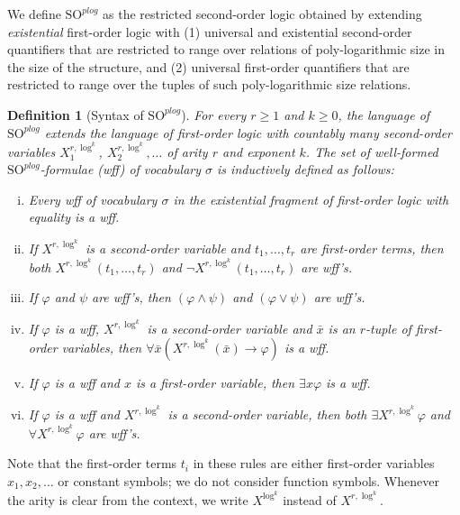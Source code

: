 \documentclass{article}
\newtheorem{definition}{Definition}
\begin{document}
We define $\mathrm{SO}^{\mathit{plog}}$ as the restricted second-order logic obtained by extending \emph{existential} first-order logic with (1) universal and existential second-order quantifiers that are restricted to range over relations of poly-logarithmic size in the size of the structure, and (2) universal first-order quantifiers that are restricted to range over the tuples of such poly-logarithmic size relations. 

\begin{definition}[Syntax of $\mathrm{SO}^{\mathit{plog}}$]
For every $r{\geq}1$ and $k{\geq}0$, the language of $\mathrm{SO}^{\mathit{plog}}$ extends the language of first-order logic with countably many second-order variables $X_1^{r,\log^k}$, $X_2^{r,\log^k}, \dots$ of {\em arity $r$} and {\em exponent $k$}. The set of well-formed $\mathrm{SO}^{\mathit{plog}}$-formulae (wff) of vocabulary $\sigma$ is inductively defined as follows:
\begin{enumerate}[i.]

\item Every wff of vocabulary $\sigma$ in the existential fragment of first-order logic with equality is a wff.

\item If $X^{r,\log^k}$ is a second-order variable and $t_1, \ldots, t_r$ are first-order terms, then both $X^{r,\log^k}(t_1, \ldots, t_r)$ and $\neg X^{r,\log^k}(t_1, \ldots, t_r)$ are wff's.

\item If $\varphi$ and $\psi$ are wff's, then $(\varphi \wedge \psi)$ and $(\varphi \vee \psi)$ are wff's.
    
\item If $\varphi$ is a wff, $X^{r,\log^k}$ is a second-order variable and $\bar{x}$ is an $r$-tuple of first-order variables, then $\forall \bar{x} (X^{r,\log^k}(\bar{x}) \rightarrow \varphi)$ is a wff.    
    
\item If $\varphi$ is a wff and $x$ is a first-order variable, then $\exists x \varphi$ is a wff.   
     
\item If $\varphi$ is a wff and $X^{r,\log^k}$ is a second-order variable, then both $\exists X^{r,\log^k} \varphi$ and $\forall X^{r,\log^k} \varphi$ are wff's.
    
\end{enumerate}
\end{definition}

Note that the first-order terms $t_i$ in these rules are either first-order variables $x_1, x_2, \ldots$ or constant symbols; we do not consider function symbols. Whenever the arity is clear from the context, we write $X^{\log^k}$ instead of $X^{r,\log^k}$. 
    
\end{document}
